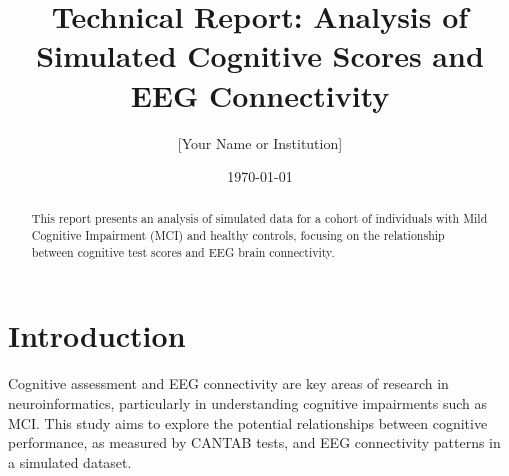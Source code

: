 \documentclass{article}
\title{Technical Report: Analysis of Simulated Cognitive Scores and EEG Connectivity}
\author{[Your Name or Institution]}
\date{\today}
\begin{document}
\maketitle

\begin{abstract}
This report presents an analysis of simulated data for a cohort of individuals with Mild Cognitive Impairment (MCI) and healthy controls, focusing on the relationship between cognitive test scores and EEG brain connectivity.
\end{abstract}

\section{Introduction}
Cognitive assessment and EEG connectivity are key areas of research in neuroinformatics, particularly in understanding cognitive impairments such as MCI. This study aims to explore the potential relationships between cognitive performance, as measured by CANTAB tests, and EEG connectivity patterns in a simulated dataset.
\cite{smith2020eeg,lee2021cantab,martinez2022machine,nguyen2023neuroinformatics,davis2022functional}
\end{document}
